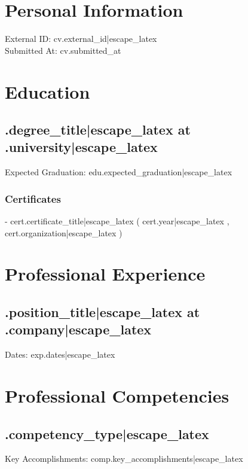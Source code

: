 \documentclass[a4paper]{article}
\begin{document}
\section*{Personal Information}
External ID: {{ cv.external_id|escape_latex }} \\
Submitted At: {{ cv.submitted_at }} %

\section*{Education}
{%
{%
\subsection*{{\edu.degree_title|escape_latex} at {\edu.university|escape_latex}}
Expected Graduation: {{ edu.expected_graduation|escape_latex }} \\
{%
\subsubsection*{Certificates}
{%
- {{ cert.certificate_title|escape_latex }} ({{ cert.year|escape_latex }}, {{ cert.organization|escape_latex }}) \\
{%
{%
{%
{%

\section*{Professional Experience}
{%
{%
\subsection*{{\exp.position_title|escape_latex} at {\exp.company|escape_latex}}
Dates: {{ exp.dates|escape_latex }} \\
{%
{%
{%

\section*{Professional Competencies}
{%
{%
\subsection*{{\comp.competency_type|escape_latex}}
Key Accomplishments: {{ comp.key_accomplishments|escape_latex }}
{%
{%

}}}}}}}}}}}}}}}}}
\end{document}

